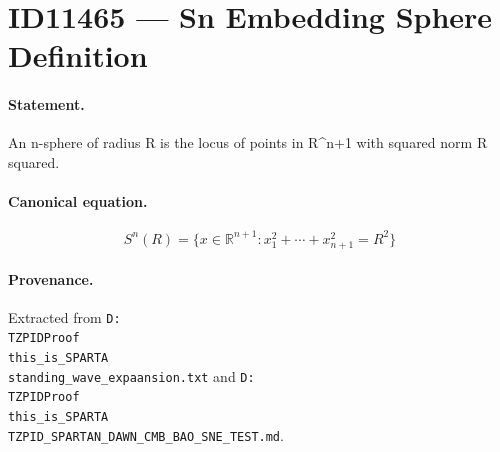 \section*{ID11465 --- Sn Embedding Sphere Definition}

\paragraph{Statement.}
An n-sphere of radius R is the locus of points in R^{n+1} with squared norm R squared.

\paragraph{Canonical equation.}
\[
S^n(R)=\{x\in\mathbb{R}^{n+1}:x_1^2+\cdots+x_{n+1}^2=R^2\}
\]

\paragraph{Provenance.}
Extracted from \texttt{D:\\TZPIDProof\\this\_is\_SPARTA\\standing\_wave\_expaansion.txt} and \texttt{D:\\TZPIDProof\\this\_is\_SPARTA\\TZPID\_SPARTAN\_DAWN\_CMB\_BAO\_SNE\_TEST.md}.
